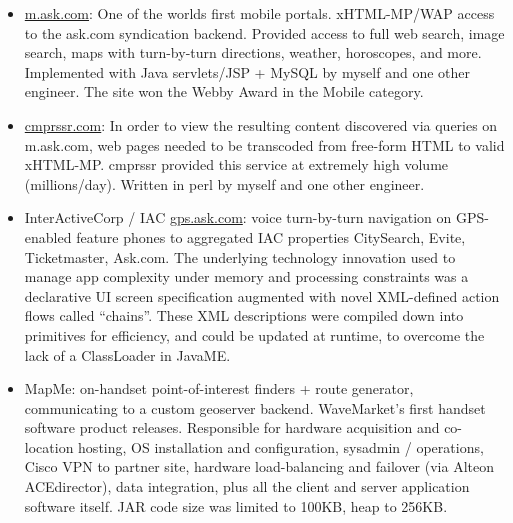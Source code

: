 \begin{itemize}
		\item \url{m.ask.com}: One of the worlds first mobile portals.  xHTML-MP/WAP access to the ask.com
		syndication backend. Provided access to full web search, 
		image search, maps with turn-by-turn directions, weather, horoscopes, and more. 
		Implemented with Java servlets/JSP + MySQL 
		by myself and one other engineer.  The site won the Webby Award in the Mobile category.

		\item \url{cmprssr.com}: In order to view the resulting content discovered via queries on m.ask.com, web 
		pages needed to be transcoded from free-form HTML to valid xHTML-MP. cmprssr provided this service at
		extremely high volume (millions/day). Written in perl by myself and one other engineer.

  		\item InterActiveCorp / IAC \url{gps.ask.com}: voice turn-by-turn navigation on GPS-enabled feature phones
		 to aggregated IAC properties CitySearch, Evite, Ticketmaster, Ask.com. The underlying technology innovation
		  used to manage app complexity under memory and processing constraints was a declarative UI screen specification
		   augmented with novel XML-defined action flows called “chains”. These XML descriptions were compiled down
		    into primitives for efficiency, and could be updated at runtime, to overcome the lack of a ClassLoader 
		    in JavaME. 
	   
  		\item MapMe: on-handset point-of-interest finders + route generator, communicating to a custom geoserver
		backend. WaveMarket’s first handset software product releases. Responsible for hardware acquisition
		and co-location hosting,
		OS installation and configuration, sysadmin / operations, Cisco VPN to partner site, hardware load-balancing
		and failover (via Alteon ACEdirector), data integration, plus all the client and server application software itself.
		JAR code size was limited to 100KB, heap to 256KB.
		
	\end{itemize}


